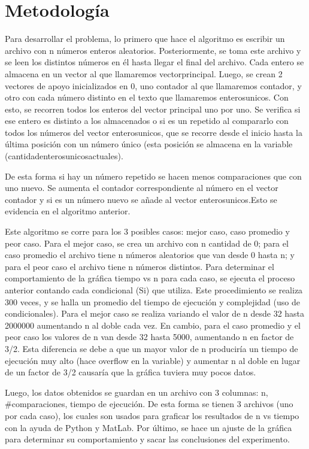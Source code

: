 \section{Metodología}
Para desarrollar el problema, lo primero que hace el algoritmo es escribir un archivo con n números enteros aleatorios. Posteriormente, se toma este archivo y se leen los distintos números en él hasta llegar el final del archivo. Cada entero se almacena en un vector al que llamaremos vectorprincipal. Luego, se crean 2 vectores de apoyo inicializados en 0, uno contador al que llamaremos contador, y otro con cada número distinto en el texto que llamaremos enterosunicos. Con esto, se recorren todos los enteros del vector principal uno por uno. Se verifica si ese entero es distinto a los almacenados o si es un repetido al compararlo con todos los números del vector enterosunicos, que se recorre desde el inicio hasta la última posición con un número único (esta posición se almacena en la variable (cantidadenterosunicosactuales). 


De esta forma si hay un número repetido se hacen menos comparaciones que con uno nuevo. Se aumenta el contador correspondiente al número en el vector contador y si es un número nuevo se añade al vector enterosunicos.Esto se evidencia en el algoritmo anterior.


Este algoritmo se corre para los 3 posibles casos: mejor caso, caso promedio y peor caso. Para el mejor caso, se crea un archivo con n cantidad de 0; para el caso promedio el archivo tiene n números aleatorios que van desde 0 hasta n; y para el peor caso el archivo tiene n números distintos. Para determinar el comportamiento de la gráfica tiempo vs n para cada caso, se ejecuta el proceso anterior contando cada condicional (Si) que utiliza. Este procedimiento se realiza 300 veces, y se halla un promedio del tiempo de ejecución y complejidad (uso de condicionales). Para el mejor caso se realiza variando el valor de n desde 32 hasta 2000000 aumentando n al doble cada vez. En cambio, para el caso promedio y el peor caso los valores de n van desde 32 hasta 5000, aumentando n en factor de 3/2. Esta diferencia se debe a que un mayor valor de n produciría un tiempo de ejecución muy alto (hace overflow en la variable) y aumentar n al doble en lugar de un factor de 3/2 causaría que la gráfica tuviera muy pocos datos.  


Luego, los datos obtenidos se guardan en un archivo con 3 columnas: n, #comparaciones, tiempo de ejecución. De esta forma se tienen 3 archivos (uno por cada caso), los cuales son usados para graficar los resultados de n vs tiempo con la ayuda de Python y MatLab. Por último, se hace un ajuste de la gráfica para determinar su comportamiento y sacar las conclusiones del experimento. 